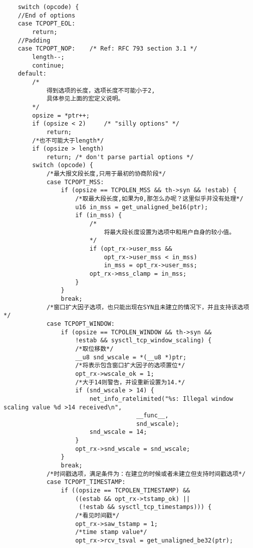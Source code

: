 \begin{verbatim}
    switch (opcode) {
    //End of options
    case TCPOPT_EOL:
        return;
    //Padding           
    case TCPOPT_NOP:    /* Ref: RFC 793 section 3.1 */
        length--;
        continue;
    default:
        /*
            得到选项的长度，选项长度不可能小于2,
            具体参见上面的宏定义说明。
        */
        opsize = *ptr++;
        if (opsize < 2)     /* "silly options" */
            return;
        /*也不可能大于length*/
        if (opsize > length)
            return; /* don't parse partial options */
        switch (opcode) {
            /*最大报文段长度,只用于最初的协商阶段*/
            case TCPOPT_MSS:
                if (opsize == TCPOLEN_MSS && th->syn && !estab) {
                    /*取最大段长度,如果为0,那怎么办呢？这里似乎并没有处理*/
                    u16 in_mss = get_unaligned_be16(ptr);
                    if (in_mss) {
                        /*
                            将最大段长度设置为选项中和用户自身的较小值。
                        */
                        if (opt_rx->user_mss &&
                            opt_rx->user_mss < in_mss)
                            in_mss = opt_rx->user_mss;
                        opt_rx->mss_clamp = in_mss;
                    }
                }
                break;
            /*窗口扩大因子选项，也只能出现在SYN且未建立的情况下，并且支持该选项*/
            case TCPOPT_WINDOW:
                if (opsize == TCPOLEN_WINDOW && th->syn &&
                    !estab && sysctl_tcp_window_scaling) {
                    /*取位移数*/
                    __u8 snd_wscale = *(__u8 *)ptr;
                    /*将表示包含窗口扩大因子的选项置位*/
                    opt_rx->wscale_ok = 1;
                    /*大于14则警告，并设重新设置为14.*/
                    if (snd_wscale > 14) {
                        net_info_ratelimited("%s: Illegal window scaling value %d >14 received\n",
                                     __func__,
                                     snd_wscale);
                        snd_wscale = 14;
                    }
                    opt_rx->snd_wscale = snd_wscale;
                }
                break;
            /*时间戳选项，满足条件为：在建立的时候或者未建立但支持时间戳选项*/
            case TCPOPT_TIMESTAMP:
                if ((opsize == TCPOLEN_TIMESTAMP) &&
                    ((estab && opt_rx->tstamp_ok) ||
                     (!estab && sysctl_tcp_timestamps))) {
                    /*看见时间戳*/                          
                    opt_rx->saw_tstamp = 1;
                    /*time stamp value*/
                    opt_rx->rcv_tsval = get_unaligned_be32(ptr);

\end{verbatim}
